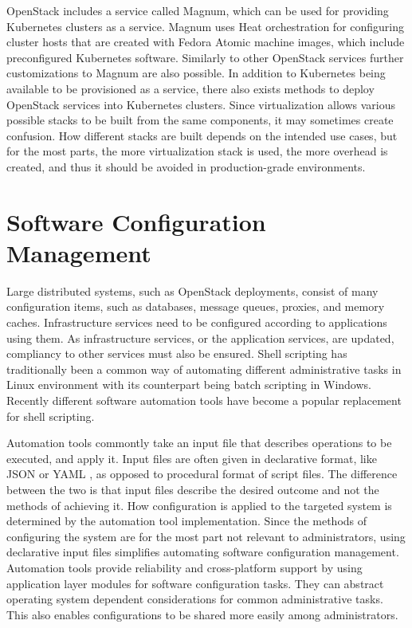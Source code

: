 OpenStack includes a service called Magnum, which can be used for providing
Kubernetes clusters as a service. Magnum uses Heat orchestration for
configuring cluster hosts that are created with Fedora Atomic
\cite{projectatomic} machine images, which include preconfigured Kubernetes
software. Similarly to other OpenStack services further customizations to
Magnum are also possible. In addition to Kubernetes being available to be
provisioned as a service, there also exists methods to deploy OpenStack
services into Kubernetes clusters. Since virtualization allows various possible
stacks to be built from the same components, it may sometimes create confusion.
How different stacks are built depends on the intended use cases, but for the
most parts, the more virtualization stack is used, the more overhead is
created, and thus it should be avoided in production-grade environments.

\section{Software Configuration Management} \label{software-configuration-management}

Large distributed systems, such as OpenStack deployments, consist of many
configuration items, such as databases, message queues, proxies, and memory
caches. Infrastructure services need to be configured according to applications
using them. As infrastructure services, or the application services, are
updated, compliancy to other services must also be ensured. Shell scripting has
traditionally been a common way of automating different administrative tasks in
Linux environment with its counterpart being batch scripting in Windows.
Recently different software automation tools have become a popular replacement
for shell scripting.

Automation tools commontly take an input file that describes operations to be
executed, and apply it. Input files are often given in declarative format, like
JSON \cite{json} or YAML \cite{yaml}, as opposed to procedural format of script
files. The difference between the two is that input files describe the desired
outcome and not the methods of achieving it. How configuration is applied to
the targeted system is determined by the automation tool implementation. Since
the methods of configuring the system are for the most part not relevant to
administrators, using declarative input files simplifies automating software
configuration management. Automation tools provide reliability and
cross-platform support by using application layer modules for software
configuration tasks. They can abstract operating system dependent
considerations for common administrative tasks. This also enables
configurations to be shared more easily among administrators.

